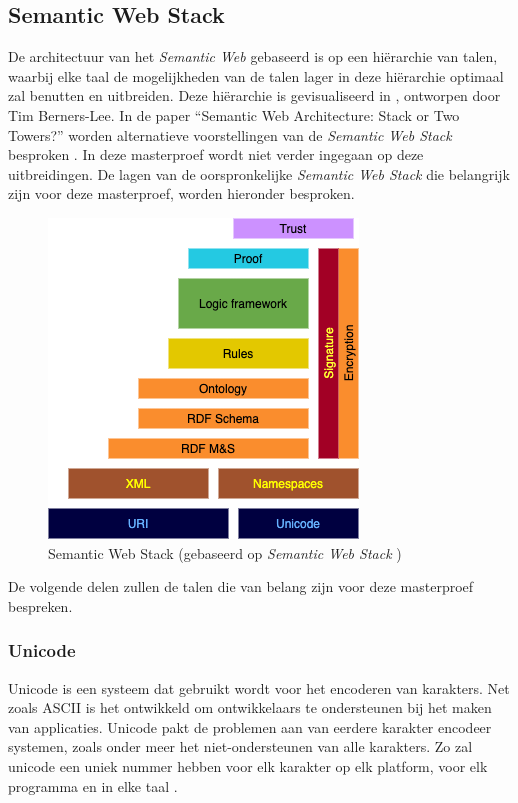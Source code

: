 \subsection{Semantic Web Stack}
De architectuur van het \textit{Semantic Web} gebaseerd is op een hiërarchie van talen, waarbij elke taal de mogelijkheden van de talen lager in deze hiërarchie optimaal zal benutten en uitbreiden. Deze hiërarchie is gevisualiseerd in , ontworpen door Tim Berners-Lee. In de paper ``Semantic Web Architecture: Stack or Two Towers?'' worden alternatieve voorstellingen van de \textit{Semantic Web Stack} besproken \cite{horrocks2005semantic}. In deze masterproef wordt niet verder ingegaan op deze uitbreidingen. De lagen van de oorspronkelijke \textit{Semantic Web Stack} die belangrijk zijn voor deze masterproef, worden hieronder besproken.

\begin{figure}[ht]
    \centering
    \includegraphics[width=0.5\linewidth]{images/Semantic-Web-Stack.png}
    \caption{Semantic Web Stack (gebaseerd op \textit{Semantic Web Stack} \cite{semanticwebstack})}
    \label{fig:semantic_web_stack}
\end{figure}

De volgende delen zullen de talen die van belang zijn voor deze masterproef bespreken.

\subsubsection{Unicode}
Unicode is een systeem dat gebruikt wordt voor het encoderen van karakters. Net zoals ASCII is het ontwikkeld om ontwikkelaars te ondersteunen bij het maken van applicaties. Unicode pakt de problemen aan van eerdere karakter encodeer systemen, zoals onder meer het niet-ondersteunen van alle karakters. Zo zal unicode een uniek nummer hebben voor elk karakter op elk platform, voor elk programma en in elke taal \cite{unicode}.

